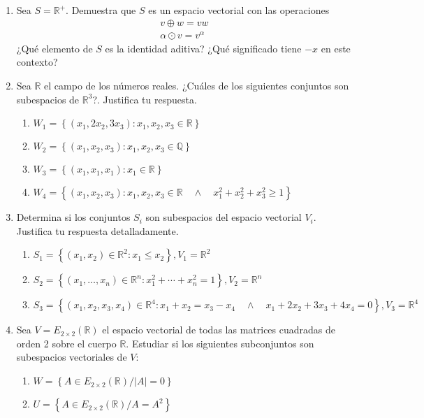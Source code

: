 \documentclass[12pt,letterpaper]{article}
\begin{document}
\begin{enumerate}
  \item Sea $S = \mathbb{R}^+$. Demuestra que $S$ es un espacio vectorial con las operaciones
  \begin{align*}
    v \oplus w = vw\\
    \alpha \odot v = v^{\alpha}
  \end{align*}
  ¿Qué elemento de $S$ es la identidad aditiva? ¿Qué significado tiene $-x$ en este contexto?
  \item Sea $\mathbb{R}$ el campo de los números reales. ¿Cuáles de los siguientes conjuntos son subespacios de $\mathbb{R}^3$?. Justifica tu respuesta.
  \begin{enumerate}
    \item $W_1 = \left\{(x_1,2x_2,3x_3) : x_1,x_2,x_3 \in \mathbb{R}\right\}$
    \item $W_2 = \left\{(x_1,x_2,x_3) : x_1,x_2,x_3 \in \mathbb{Q}\right\}$
    \item $W_3 = \left\{(x_1,x_1,x_1) : x_1 \in \mathbb{R}\right\}$
    \item $W_4 = \left\{(x_1,x_2,x_3) : x_1,x_2,x_3 \in \mathbb{R}\quad \wedge\quad x_1^2+x_2^2+x_3^2\geq1 \right\}$
  \end{enumerate}
  \item Determina si los conjuntos $S_i$ son subespacios del espacio vectorial $V_i$. Justifica tu respuesta detalladamente.
  \begin{enumerate}
    \item $S_1=\left\{(x_1,x_2) \in \mathbb{R}^2 : x_1\leq x_2\right\}, V_1=\mathbb{R}^2$
    \item $S_2=\left\{(x_1,\ldots,x_n) \in \mathbb{R}^n : x_1^2+\cdots+x_n^2=1\right\}, V_2=\mathbb{R}^n$
    \item $S_3=\left\{(x_1,x_2,x_3,x_4) \in \mathbb{R}^4 : x_1+x_2=x_3-x_4\quad\wedge\quad x_1+2x_2+3x_3+4x_4=0\right\}, V_3=\mathbb{R}^4$
  \end{enumerate}
  \item Sea $V=E_{2\times2}(\mathbb{R})$ el espacio vectorial de todas las matrices cuadradas de orden 2 sobre el cuerpo $\mathbb{R}$. Estudiar si los siguientes subconjuntos son subespacios vectoriales de $V$:
  \begin{multicols}{2}
    \begin{enumerate}
      \item $W=\left\{A \in E_{2\times2}(\mathbb{R}) / |A|=0\right\}$
      \item $U=\left\{A \in E_{2\times2}(\mathbb{R}) / A=A^2 \right\}$
    \end{enumerate}    

\end{multicols}
\end{enumerate}
\end{document}
